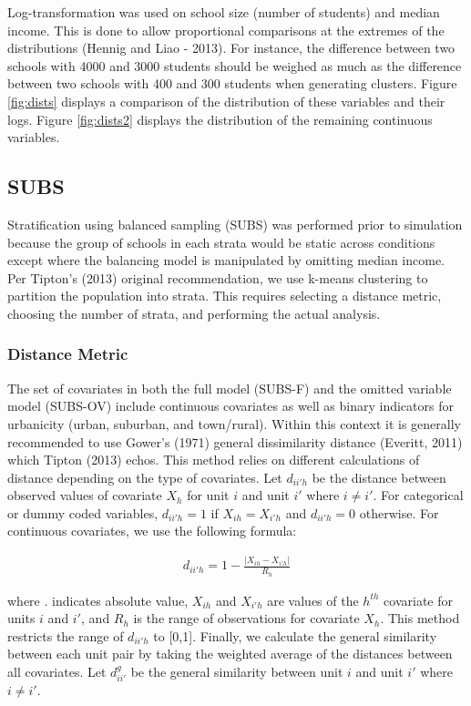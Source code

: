 \documentclass[man]{apa6}
\theoremstyle{definition}
\theoremstyle{definition}
\theoremstyle{definition}
\theoremstyle{remark}
\begin{document}
Log-transformation was used on school size (number of students) and
median income. This is done to allow proportional comparisons at the
extremes of the distributions (Hennig and Liao - 2013). For instance,
the difference between two schools with 4000 and 3000 students should be
weighed as much as the difference between two schools with 400 and 300
students when generating clusters. Figure \ref{fig:dists} displays a
comparison of the distribution of these variables and their logs. Figure
\ref{fig:dists2} displays the distribution of the remaining continuous
variables.

\subsection{SUBS}\label{subs}

Stratification using balanced sampling (SUBS) was performed prior to
simulation because the group of schools in each strata would be static
across conditions except where the balancing model is manipulated by
omitting median income. Per Tipton's (2013) original recommendation, we
use k-means clustering to partition the population into strata. This
requires selecting a distance metric, choosing the number of strata, and
performing the actual analysis.

\subsubsection{Distance Metric}\label{distance-metric}

The set of covariates in both the full model (SUBS-F) and the omitted
variable model (SUBS-OV) include continuous covariates as well as binary
indicators for urbanicity (urban, suburban, and town/rural). Within this
context it is generally recommended to use Gower's (1971) general
dissimilarity distance (Everitt, 2011) which Tipton (2013) echos. This
method relies on different calculations of distance depending on the
type of covariates. Let \(d_{ii'h}\) be the distance between observed
values of covariate \(X_{h}\) for unit \(i\) and unit \(i'\) where
\(i \ne i'\). For categorical or dummy coded variables, \(d_{ii'h} = 1\)
if \(X_{ih} = X_{i'h}\) and \(d_{ii'h} = 0\) otherwise. For continuous
covariates, we use the following formula:

\begin{align}
  d_{ii'h} = 1 - \frac{|X_{ih} - X_{i'h}|}{R_h}
\end{align}

where \textbar{}.\textbar{} indicates absolute value, \(X_{ih}\) and
\(X_{i'h}\) are values of the \(h^{th}\) covariate for units \(i\) and
\(i'\), and \(R_h\) is the range of observations for covariate \(X_h\).
This method restricts the range of \(d_{ii'h}\) to {[}0,1{]}. Finally,
we calculate the general similarity between each unit pair by taking the
weighted average of the distances between all covariates. Let
\(d^{g}_{ii'}\) be the general similarity between unit \(i\) and unit
\(i'\) where \(i \ne i'\).
\end{document}
